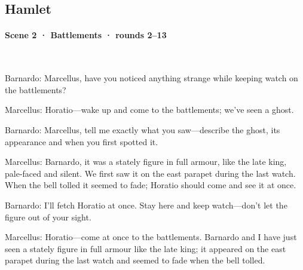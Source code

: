 \subsection*{Hamlet}
\paragraph{Scene 2 · Battlements · rounds 2–13}\mbox{}\\[2pt]
\begin{zhblock}\small\setlength{\parskip}{3pt}
Barnardo:
Marcellus, have you noticed anything strange while keeping watch on the battlements?
\par Marcellus:
Horatio—wake up and come to the battlements; we've seen a ghost.
\par Barnardo:
Marcellus, tell me exactly what you saw—describe the ghost, its appearance and when you first spotted it.
\par Marcellus:
Barnardo, it was a stately figure in full armour, like the late king, pale-faced and silent.
We first saw it on the east parapet during the last watch.
When the bell tolled it seemed to fade; Horatio should come and see it at once.
\par Barnardo:
I'll fetch Horatio at once.
Stay here and keep watch—don't let the figure out of your sight.
\par Marcellus:
Horatio—come at once to the battlements.
Barnardo and I have just seen a stately figure in full armour like the late king; it appeared on the east parapet during the last watch and seemed to fade when the bell tolled.
\end{zhblock}

